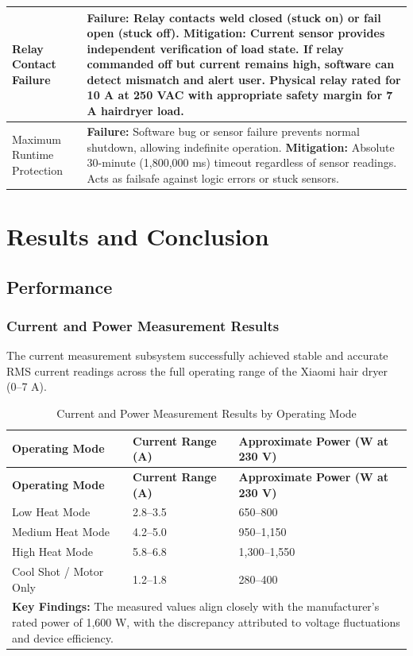 \documentclass[11pt,a4paper]{article}
\begin{document}
\begin{longtable}{|p{}|p{}|}
\hline
Relay Contact Failure & \textbf{Failure:} Relay contacts weld closed (stuck on) or fail open (stuck off). \newline \textbf{Mitigation:} Current sensor provides independent verification of load state. If relay commanded off but current remains high, software can detect mismatch and alert user. Physical relay rated for 10 A at 250 VAC with appropriate safety margin for 7 A hairdryer load. \\
\hline
Maximum Runtime Protection & \textbf{Failure:} Software bug or sensor failure prevents normal shutdown, allowing indefinite operation. \newline \textbf{Mitigation:} Absolute 30-minute (1,800,000 ms) timeout regardless of sensor readings. Acts as failsafe against logic errors or stuck sensors. \\
\hline
\end{longtable}

\newpage
\section{Results and Conclusion}

\subsection{Performance}

\subsubsection*{Current and Power Measurement Results}

The current measurement subsystem successfully achieved stable and accurate RMS current readings across the full operating range of the Xiaomi hair dryer (0--7 A).

\begin{longtable}{|p{}|p{}|p{}|}
\caption{Current and Power Measurement Results by Operating Mode}
\label{tab:current_power_results} \\
\hline
\textbf{Operating Mode} & \textbf{Current Range (A)} & \textbf{Approximate Power (W at 230 V)} \\
\hline
\endfirsthead
\hline
\textbf{Operating Mode} & \textbf{Current Range (A)} & \textbf{Approximate Power (W at 230 V)} \\
\hline
\endhead
\hline
\endfoot
\hline
\endlastfoot
Low Heat Mode & 2.8--3.5 & 650--800 \\
\hline
Medium Heat Mode & 4.2--5.0 & 950--1,150 \\
\hline
High Heat Mode & 5.8--6.8 & 1,300--1,550 \\
\hline
Cool Shot / Motor Only & 1.2--1.8 & 280--400 \\
\hline
\multicolumn{3}{|p{0.92\textwidth}|}{\textbf{Key Findings:} The measured values align closely with the manufacturer's rated power of 1,600 W, with the discrepancy attributed to voltage fluctuations and device efficiency.} \\
\hline
\end{longtable}
\end{document}
